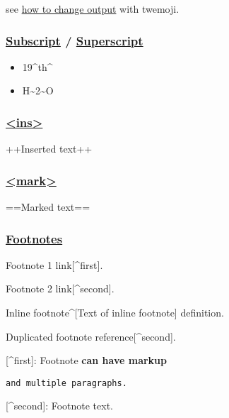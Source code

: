 \documentclass[]{article}
\providecommand{\tightlist}{%
  \setlength{\itemsep}{0pt}\setlength{\parskip}{0pt}}
\begin{document}
see
\href{https://github.com/markdown-it/markdown-it-emoji\#change-output}{how
to change output} with twemoji.

\subsubsection{\texorpdfstring{\href{https://github.com/markdown-it/markdown-it-sub}{Subscript}
/
\href{https://github.com/markdown-it/markdown-it-sup}{Superscript}}{Subscript / Superscript}}

\begin{itemize}
\tightlist
\item
  19\^{}th\^{}
\item
  H\textasciitilde{}2\textasciitilde{}O
\end{itemize}

\subsubsection{\texorpdfstring{\href{https://github.com/markdown-it/markdown-it-ins}{\textless{}ins\textgreater{}}}{\textless{}ins\textgreater{}}}

++Inserted text++

\subsubsection{\texorpdfstring{\href{https://github.com/markdown-it/markdown-it-mark}{\textless{}mark\textgreater{}}}{\textless{}mark\textgreater{}}}

==Marked text==

\subsubsection{\texorpdfstring{\href{https://github.com/markdown-it/markdown-it-footnote}{Footnotes}}{Footnotes}}

Footnote 1 link{[}\^{}first{]}.

Footnote 2 link{[}\^{}second{]}.

Inline footnote\^{}{[}Text of inline footnote{]} definition.

Duplicated footnote reference{[}\^{}second{]}.

{[}\^{}first{]}: Footnote \textbf{can have markup}

\begin{verbatim}
and multiple paragraphs.
\end{verbatim}

{[}\^{}second{]}: Footnote text.
\end{document}
